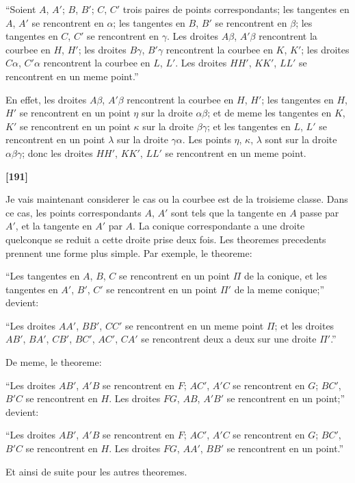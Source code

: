 \documentclass[11pt,a4paper]{book}
\begin{document}
``Soient $A$, $A'$; $B$, $B'$; $C$, $C'$ trois paires de points correspondants; les tangentes
en $A$, $A'$ se rencontrent en $\alpha$; les tangentes en $B$, $B'$ se rencontrent en $\beta$; les tangentes en
$C$, $C'$ se rencontrent en $\gamma$. Les droites $A\beta$, $A'\beta$ rencontrent la courbee en $H$, $H'$; les droites
$B\gamma$, $B'\gamma$ rencontrent la courbee en $K$, $K'$; les droites $C\alpha$, $C'\alpha$ rencontrent la courbee en $L$, $L'$.
Les droites $HH'$, $KK'$, $LL'$ se rencontrent en un meme point.''

En effet, les droites $A\beta$, $A'\beta$ rencontrent la courbee en $H$, $H'$; les tangentes en $H$, $H'$
se rencontrent en un point $\eta$ sur la droite $\alpha\beta$; et de meme les tangentes en $K$, $K'$ se
rencontrent en un point $\kappa$ sur la droite $\beta\gamma$; et les tangentes en $L$, $L'$ se rencontrent en
un point $\lambda$ sur la droite $\gamma\alpha$. Les points $\eta$, $\kappa$, $\lambda$ sont sur la droite $\alpha\beta\gamma$; donc les droites
$HH'$, $KK'$, $LL'$ se rencontrent en un meme point.

\textbf{[191]}

Je vais maintenant considerer le cas ou la courbee est de la troisieme classe. Dans
ce cas, les points correspondants $A$, $A'$ sont tels que la tangente en $A$ passe par $A'$,
et la tangente en $A'$ par $A$. La conique correspondante a une droite quelconque se
reduit a cette droite prise deux fois. Les theoremes precedents prennent une forme
plus simple. Par exemple, le theoreme:

``Les tangentes en $A$, $B$, $C$ se rencontrent en un point $\Pi$ de la conique, et les
tangentes en $A'$, $B'$, $C'$ se rencontrent en un point $\Pi'$ de la meme conique;'' devient:

``Les droites $AA'$, $BB'$, $CC'$ se rencontrent en un meme point $\Pi$; et les droites
$AB'$, $BA'$, $CB'$, $BC'$, $AC'$, $CA'$ se rencontrent deux a deux sur une droite $\Pi'$.''

De meme, le theoreme:

``Les droites $AB'$, $A'B$ se rencontrent en $F$; $AC'$, $A'C$ se rencontrent en $G$; $BC'$,
$B'C$ se rencontrent en $H$. Les droites $FG$, $AB$, $A'B'$ se rencontrent en un point;'' devient:

``Les droites $AB'$, $A'B$ se rencontrent en $F$; $AC'$, $A'C$ se rencontrent en $G$; $BC'$,
$B'C$ se rencontrent en $H$. Les droites $FG$, $AA'$, $BB'$ se rencontrent en un point.''

Et ainsi de suite pour les autres theoremes.
\end{document}
